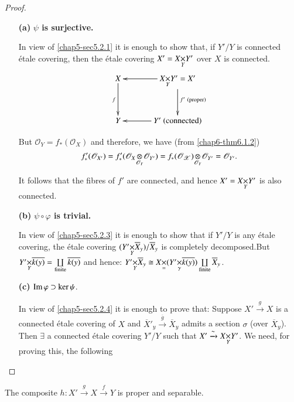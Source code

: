 \begin{proof}
\begin{itemize}
\item[{\bf (a)}] {\bf {\boldmath$\psi$} is surjective.}

In view of \ref{chap5-sec5.2.1} it is enough to show that, if $Y'/Y$ is
connected \'etale covering, then the \'etale covering
$X'=\fprod{X}{Y'}{Y}$ over $X$ is connected.
\[
\xymatrix@=1.2cm{
X\ar[d]_{f} & \fprod{X}{Y'}{Y}=X'\ar[l]\ar[d]^{f'\ \text{(proper)}}\\
Y & Y'\ \text{(connected)}\ar[l]
}
\]

But $\mathscr{O}_{Y}=f_{\ast}(\mathscr{O}_{X})$ and therefore, we have
(from \ref{chap6-thm6.1.2})
$$
f'_{\ast}(\mathscr{O}_{X'})=f'_{\ast}(\foprod{\mathscr{O}_{X}}{\mathscr{O}_{Y'}}{\mathscr{O}_{Y}})=
\foprod{f_{\ast}(\mathscr{O_X})}{\mathscr{O}_{Y'}}{\mathscr{O}_{Y}}=\mathscr{O}_{Y'}.
$$

It follows that the fibres of $f'$ are connected, and hence
$X'=\fprod{X}{Y'}{Y}$ is also connected.

\item[{\bf(b)}] {\bf {\boldmath$\psi\circ\varphi$} is trivial.}

In view of \ref{chap5-sec5.2.3} it is enough to show that if $Y'/Y$ is any
\'etale covering, the \'etale covering
$(\fprod{Y'}{\overline{X}_{y}}{Y})/\overline{X}_{y}$ is completely
decomposed.\pageoriginale But
$\fprod{Y'}{\overline{k(y)}}{Y}=\coprod\limits_{\text{finite}}
\overline{k(y)}$ and hence: $\fprod{Y'}{\overline{X}_{y}}{Y}\cong
\fprod{X}{(\fprod{Y'}{\overline{k(y)}}{\gamma})}=\coprod\limits_{\text{finite}}\overline{X}_{y}$. 

\item[{\bf(c)}] {\boldmath$\operatorname{Im}\varphi\supset\ker \psi$.}

In view of \ref{chap5-sec5.2.4} it is enough to prove that: Suppose
$X'\xrightarrow{g}X$ is a connected \'etale covering of $X$ and
$\overline{X}'_{y}\xrightarrow{\overline{g}}\overline{X}_{y}$ admits a section
$\sigma$ (over $\overline{X}_{y}$). Then $\exists$ a connected \'etale
covering $Y'/Y$ such that $X'\xrightarrow{\sim}\fprod{X}{Y'}{Y}$. We
need, for proving this, the following
\end{itemize}
\end{proof}

\setcounter{sublemma}{1}
\begin{sublemma}\label{chap6-lem6.3.2.2}
The composite $h:X'\xrightarrow{g}X\xrightarrow{f}Y$ is proper and
separable. 
\end{sublemma}


